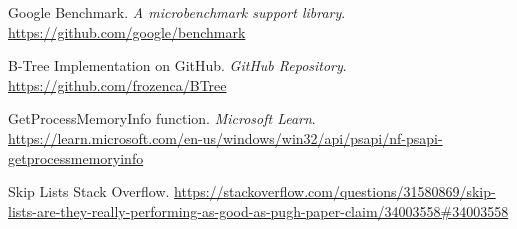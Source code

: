 \documentclass[12pt]{article}
\begin{document}
   



\vspace{14pt}


\begin{thebibliography}{9}
	Google Benchmark. 
	\textit{A microbenchmark support library}. \\
	\url{https://github.com/google/benchmark}

	B-Tree Implementation on GitHub. 
	\textit{GitHub Repository}. \\
	\url{https://github.com/frozenca/BTree}

	GetProcessMemoryInfo function. 
	\textit{Microsoft Learn}. \\
	\url{https://learn.microsoft.com/en-us/windows/win32/api/psapi/nf-psapi-getprocessmemoryinfo}

	Skip Lists Stack Overflow.
	\sloppy\url{https://stackoverflow.com/questions/31580869/skip-lists-are-they-really-performing-as-good-as-pugh-paper-claim/34003558\#34003558}

\end{thebibliography}

	
\end{document}
